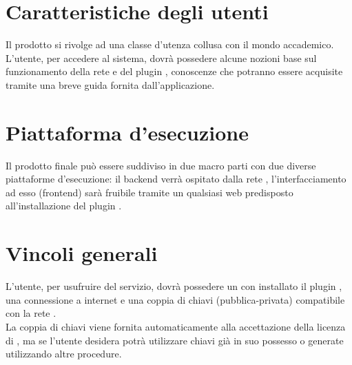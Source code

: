 \documentclass[AnalisiDeiRequisiti.tex]{subfiles}
\begin{document}
\section{Caratteristiche degli utenti}
Il prodotto si rivolge ad una classe d'utenza collusa con il mondo accademico.\\
L'utente, per accedere al sistema, dovrà possedere alcune nozioni base sul funzionamento della rete  e del plugin , conoscenze che potranno essere acquisite tramite una breve guida fornita dall'applicazione.

\section{Piattaforma d'esecuzione}
Il prodotto finale può essere suddiviso in due macro parti con due diverse piattaforme d'esecuzione: il backend verrà ospitato dalla rete , l'interfacciamento ad esso (frontend) sarà fruibile tramite un qualsiasi  web predisposto all'installazione del plugin .

\section{Vincoli generali}
L'utente, per usufruire del servizio, dovrà possedere un  con installato il plugin , una connessione a internet e una coppia di chiavi (pubblica-privata) compatibile con la rete .\\
La coppia di chiavi viene fornita automaticamente alla accettazione della licenza di , ma se l'utente desidera potrà utilizzare chiavi già in suo possesso o generate utilizzando altre procedure.	
\end{document}
